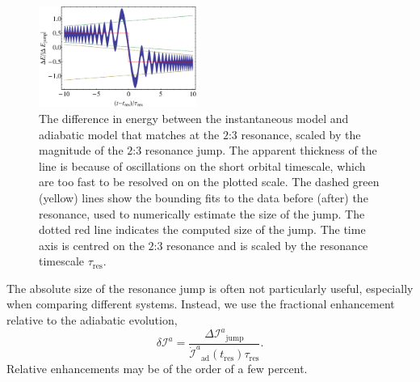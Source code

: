 \documentclass[aps,prd,amsfonts,amssymb,amsmath,nofootinbib,showpacs,superscriptaddress,twocolumn,floatfix]{revtex4-1}
\newcommand{\sub}[1]{\ensuremath{_\mathrm{#1}}}
\begin{document}

\begin{figure}
\centering
\includegraphics[width=0.46\textwidth]{Fig_res_jump_calc}
\caption{\label{fig:res-jump-calc}The difference in energy between the instantaneous model and adiabatic model that matches at the $2$:$3$ resonance, scaled by the magnitude of the $2$:$3$ resonance jump. The apparent thickness of the line is because of oscillations on the short orbital timescale, which are too fast to be resolved on on the plotted scale. The dashed green (yellow) lines show the bounding fits to the data before (after) the resonance, used to numerically estimate the size of the jump. The dotted red line indicates the computed size of the jump. The time axis is centred on the $2$:$3$ resonance and is scaled by the resonance timescale $\tau\sub{res}$.}
\end{figure}

The absolute size of the resonance jump is often not particularly useful, especially when comparing different systems. Instead, we use the fractional enhancement relative to the adiabatic evolution,
\begin{equation}
\label{eq:res-jump-ratio}
\delta \mathcal{I}^a = \frac{\Delta \mathcal{I}^a\sub{jump}}{\dot{\mathcal{I}}^a\sub{ad}(t\sub{res})\tau\sub{res}}.
\end{equation}
Relative enhancements may be of the order of a few percent.
\end{document}
